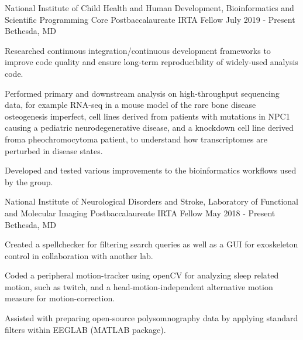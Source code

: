 
\begin{cventries}
 \cventry
 {National Institute of Child Health and Human Development, Bioinformatics and Scientific Programming Core}
 {Postbaccalaureate IRTA Fellow}
 {July 2019 - Present}
 {Bethesda, MD}
 	{
		\begin{cvitems}
        	\item {Researched continuous integration/continuous development frameworks to improve code quality and ensure long-term reproducibility of widely-used analysis code.}
        	\item {Performed primary and downstream analysis on high-throughput sequencing data, for example RNA-seq in a mouse model of the rare bone disease osteogenesis imperfect, cell lines derived from patients with mutations in NPC1 causing a pediatric neurodegenerative disease, and a knockdown cell line derived froma pheochromocytoma patient, to understand how transcriptomes are perturbed in disease states.}
        	\item {Developed and tested various improvements to the bioinformatics workflows used by the group.}
        \end{cvitems}
 	}
 \cventry
 {National Institute of Neurological Disorders and Stroke, Laboratory of Functional and Molecular Imaging}
 {Postbaccalaureate IRTA Fellow}
 {May 2018 - Present}
 {Bethesda, MD}
 	{
		\begin{cvitems}
        	\item {Created a spellchecker for filtering search queries as well as a GUI for exoskeleton control in collaboration with another lab.}
        	\item {Coded a peripheral motion-tracker using openCV for analyzing sleep related motion, such as twitch, and a head-motion-independent alternative motion measure for motion-correction.}
        	\item {Assisted with preparing open-source polysomnography data by applying standard filters within EEGLAB (MATLAB package).}

\end{cvitems}}
\end{cventries}
